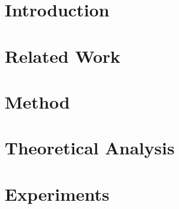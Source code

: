 \documentclass{article}  %
\begin{document}

\section{Introduction} \label{sec:intro}



\section{Related Work}



\section{Method}



\section{Theoretical Analysis}



\section{Experiments}



\end{document}
